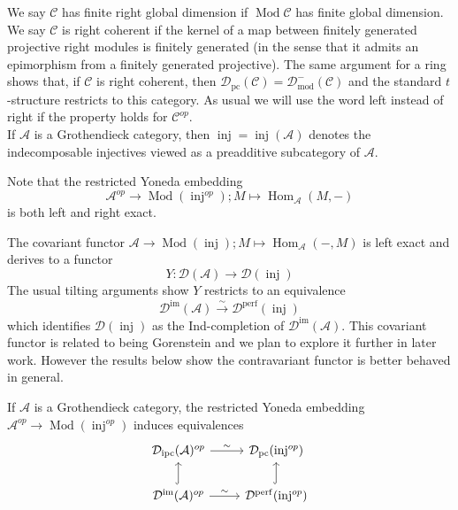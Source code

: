 \documentclass[12pt,oneside]{amsart}
\DeclareMathOperator{\Hom}{Hom}
\DeclareMathOperator{\Mod}{Mod}
\DeclareMathOperator{\fdmod}{mod}
\DeclareMathOperator{\perf}{perf}
\DeclareMathOperator{\inj}{inj}
\DeclareMathOperator{\immac}{im}
\DeclareMathOperator{\ipscoh}{ipc}
\DeclareMathOperator{\pc}{pc}
\begin{document}
We say $\mathcal{C}$ has finite right global dimension if $\Mod \mathcal{C}$ has finite global dimension. We say $\mathcal{C}$ is right coherent if the kernel of a map between finitely generated projective right  modules is finitely generated (in the sense that it admits an epimorphism from a finitely generated projective). The same argument for a ring shows that, if $\mathcal{C}$ is right coherent, then $\mathcal{D}_{\pc}(\mathcal{C}) = \mathcal{D}^-_{\fdmod}(\mathcal{C})$ and the standard $t$-structure restricts to this category. As usual we will use the word left instead of right if the property holds for $\mathcal{C}^{op}$. 
\\

If $\mathcal{A}$ is a Grothendieck category, then $\inj = \inj(\mathcal{A})$ denotes the indecomposable injectives viewed as a preadditive subcategory of $\mathcal{A}$.

\begin{remark}
Note that the restricted Yoneda embedding 
\[
\mathcal{A}^{op} \to \Mod(\inj^{op}); M \mapsto \Hom_{\mathcal{A}}(M,-)
\]
is both left and right exact.
\end{remark}


\begin{remark}
The covariant functor $\mathcal{A} \to \Mod(\inj); M \mapsto \Hom_{\mathcal{A}}(-,M)$ is left exact and derives to a functor  
\[
Y: \mathcal{D}(\mathcal{A}) \to \mathcal{D}(\inj)
\]
The usual tilting arguments show $Y$ restricts to an equivalence
\[
\mathcal{D}^{\immac}(\mathcal{A}) \xrightarrow{\sim} \mathcal{D}^{\perf}(\inj)
\]
which identifies $\mathcal{D}(\inj)$ as the Ind-completion of $\mathcal{D}^{\immac}(\mathcal{A})$. This covariant functor is related to being Gorenstein and we plan to explore it further in later work. However the results below show the contravariant functor is better behaved in general. 
\end{remark}


\begin{theorem} \label{tiltingequiv1}
If $\mathcal{A}$ is a Grothendieck category, the restricted Yoneda embedding $\mathcal{A}^{op} \to \Mod (\inj^{op})$ induces equivalences
\[
\begin{tikzcd}
\mathcal{D}_{\ipscoh}(\mathcal{A})^{op} \arrow[r,"\sim"] & \mathcal{D}_{\pc}(\inj^{op}) \\
\mathcal{D}^{\immac}(\mathcal{A})^{op} \arrow[u,hook] \arrow[r,"\sim"] & \mathcal{D}^{\perf}(\inj^{op}) \arrow[u,hook]
\end{tikzcd}
\]

\end{theorem}
\end{document}
